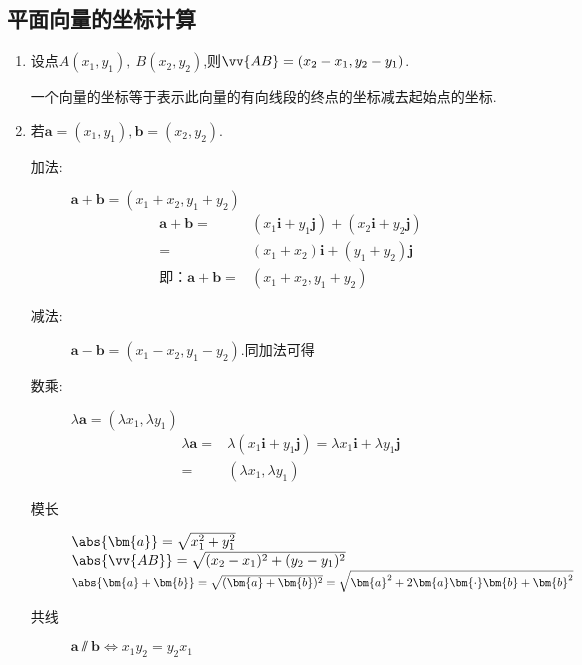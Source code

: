 \begin{Theorem}[平面向量基本定理]
  \subsection{平面向量的坐标计算}
    \begin{enumerate}
      \item
        设点$ A(x_1,y_1),~B(x_2,y_2) $,则$ \vv{AB}=(x_2-x_1,y_2-y_1) $.\par
        一个向量的坐标等于表示此向量的有向线段的终点的坐标减去起始点的坐标.
      \item
        若$\bm{a}=\left(x_1,y_1\right),\bm{b}=\left(x_2,y_2\right)$.
        \begin{description}
          \item[加法:]
            $\bm{a}+\bm{b}=(x_1+x_2,y_1+y_2)$
            \begin{equation*}
            \begin{aligned}
            \bm{a}+\bm{b}=&\left(x_1\bm{i}+y_1\bm{j}\right)+\left(x_2\bm{i}+y_2\bm{j}\right)\\
            =&\left(x_1+x_2\right)\bm{i}+\left(y_1+y_2\right)\bm{j}\\
            \text{即：}\bm{a}+\bm{b}=&(x_1+x_2,y_1+y_2)
            \end{aligned}
            \end{equation*}
          \item[减法:] $\bm{a}-\bm{b}=\left(x_1-x_2,y_1-y_2\right)$.同加法可得
          \item[数乘:]
            $ \lambda \bm{a}=\left(\lambda x_1,\lambda y_1\right) $\begin{equation*}
            \begin{aligned}
             \lambda \bm{a} =&\lambda\left(x_1\bm{i}+y_1\bm{j}\right)=\lambda x_1\bm{i}+\lambda y_1\bm{j}\\
            =&\left(\lambda x_1,\lambda y_1\right)
            \end{aligned}
            \end{equation*}
          \item[模长]
           $\abs{\bm{a}}=\sqrt{x_1^2+y_1^2}$\qquad
           $\abs{\vv{AB}}=\sqrt{(x_2-x_1)^2+(y_2-y_1)^2}$\\
           \qquad $\abs{\bm{a}+\bm{b}}=\sqrt{(\bm{a}+\bm{b})^2}=\sqrt{\bm{a}^2+2\bm{a}\bm{\cdot}\bm{b}+\bm{b}^2}$\\
          \item[共线]$\bm{a} \varparallel \bm{b}\Leftrightarrow x_1y_2=y_2x_1 $\\

\end{description}
\end{enumerate}
\end{Theorem}
